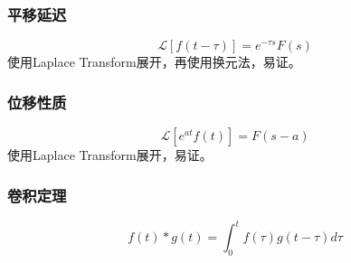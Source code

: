 \documentclass[lang=cn,10pt]{elegantbook}
\begin{document}
\subsubsection{平移延迟}
\begin{equation}
	\mathcal{L}[f(t-\tau)]=e^{-\tau s}F(s)
\end{equation}
使用Laplace Transform展开，再使用换元法，易证。

\subsubsection{位移性质}
\begin{equation}
	\mathcal{L}[e^{at}f(t)]=F(s-a)
\end{equation}
使用Laplace Transform展开，易证。

\subsubsection{卷积定理}
\begin{definition}[卷积]
	\begin{equation}
		f(t)*g(t)=\int_{0}^{t}f(\tau)g(t-\tau)d\tau
	\end{equation}
\end{definition}
\end{document}
